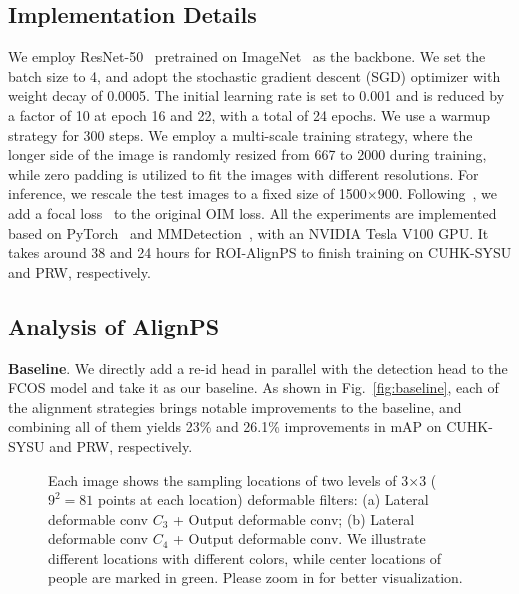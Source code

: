 \documentclass[journal]{IEEEtran}
\begin{document}
\subsection{Implementation Details}
We employ ResNet-50~\cite{DBLP:conf/cvpr/HeZRS16} pretrained on ImageNet~\cite{DBLP:conf/cvpr/DengDSLL009} as the backbone. 
We set the batch size to 4, and adopt the stochastic gradient descent (SGD) optimizer with weight decay of 0.0005. The initial learning rate is set to 0.001 and is reduced by a factor of 10 at epoch 16 and 22, with a total of 24 epochs. We use a warmup strategy for 300 steps. We employ a multi-scale training strategy, where the longer side of the image is randomly resized from 667 to 2000 during training, while zero padding is utilized to fit the images with different resolutions. For inference, we rescale the test images to a fixed size of 1500$\times$900. Following~\cite{DBLP:conf/aaai/ChenZO0S20}, we add a focal loss~\cite{DBLP:conf/iccv/LinGGHD17} to the original OIM loss.
All the experiments are implemented based on PyTorch~\cite{DBLP:conf/nips/PaszkeGMLBCKLGA19} and MMDetection~\cite{DBLP:journals/corr/abs-1906-07155}, with an NVIDIA Tesla V100 GPU. It takes around 38 and 24 hours for ROI-AlignPS to finish training on CUHK-SYSU and PRW, respectively.

\subsection{Analysis of AlignPS}\label{sec:analytical}

\textbf{Baseline}.
We directly add a re-id head in parallel with the detection head to the FCOS model and take it as our baseline. As shown in Fig.~\ref{fig:baseline}, each of the alignment strategies brings notable improvements to the baseline, and combining all of them yields 23\% and 26.1\% improvements in mAP on CUHK-SYSU and PRW, respectively.

\begin{figure*}[t]
\begin{center}
 \hfill
{}
\end{center}
\caption{Each image shows the sampling locations of two levels of 3$\times$3 ($9^2 = 81$ points at each location) deformable filters: (a) Lateral deformable conv $C_3$ + Output deformable conv; (b) Lateral deformable conv $C_4$ + Output deformable conv. We illustrate different locations with different colors, while center locations of people are marked in green. Please zoom in for better visualization.}
\label{fig:dcnvis}
\end{figure*}
\end{document}
